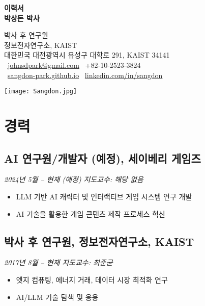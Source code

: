 \documentclass[11pt,a4paper]{article}
\begin{document}
\begin{minipage}[t]{0.69\textwidth}
{\huge\bfseries 이력서}\\[0.8cm]
{\Large\bfseries 박상돈 박사}

\vspace{0.3cm}
박사 후 연구원\\
정보전자연구소, KAIST\\
대한민국 대전광역시 유성구 대학로 291, KAIST 34141\vspace{0.3cm}\\
\faEnvelope\ \href{mailto:johnsdpark@gmail.com}{johnsdpark@gmail.com} \hfill \faPhone\ +82-10-2523-3824 \\[0.2cm]
\faGlobe\ \href{https://sangdon-park.github.io/}{sangdon-park.github.io} \hfill \faLinkedin\ \href{https://www.linkedin.com/in/sangdon/}{linkedin.com/in/sangdon}
\end{minipage}%
\hfill
\begin{minipage}[t]{0.3\textwidth}
\vspace{-0.3cm}
\begin{flushright}
\texttt{[image: Sangdon.jpg]}
\end{flushright}
\end{minipage}

\vspace{0.3cm}
\linespread{1}
\section{경력}

\subsection*{AI 연구원/개발자 (예정), 세이베리 게임즈}
\textit{2024년 5월 -- 현재 (예정)} \hfill \textit{지도교수: 해당 없음}

\begin{itemize}
    \item LLM 기반 AI 캐릭터 및 인터랙티브 게임 시스템 연구 개발
    \item AI 기술을 활용한 게임 콘텐츠 제작 프로세스 혁신
\end{itemize}

\subsection*{박사 후 연구원, 정보전자연구소, KAIST}
\textit{2017년 8월 -- 현재} \hfill \textit{지도교수: 최준균}

\begin{itemize}
    \item 엣지 컴퓨팅, 에너지 거래, 데이터 시장 최적화 연구
    \item AI/LLM 기술 탐색 및 응용
\end{itemize}
\end{document}
